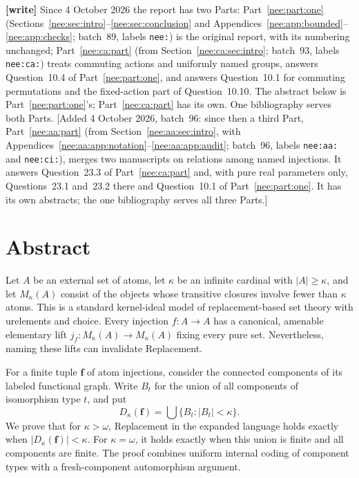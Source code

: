 \documentclass[11pt,letterpaper]{article}
\numberwithin{equation}{section}
\theoremstyle{plain}
\theoremstyle{definition}
\theoremstyle{remark}
\begin{document}
{\footnotesize\noindent\textbf{[write]} Since 4 October 2026 the report has two Parts: Part~\ref{nee:part:one} (Sections~\ref{nee:sec:intro}--\ref{nee:sec:conclusion} and Appendices~\ref{nee:app:bounded}--\ref{nee:app:checks}; batch~89, labels \texttt{nee:}) is the original report, with its numbering unchanged; Part~\ref{nee:ca:part} (from Section~\ref{nee:ca:sec:intro}; batch~93, labels \texttt{nee:ca:}) treats commuting actions and uniformly named groups, answers Question~10.4 of Part~\ref{nee:part:one}, and answers Question~10.1 for commuting permutations and the fixed-action part of Question~10.10. The abstract below is Part~\ref{nee:part:one}'s; Part~\ref{nee:ca:part} has its own. One bibliography serves both Parts. [Added 4 October 2026, batch~96: since then a third Part, Part~\ref{nee:aa:part} (from Section~\ref{nee:aa:sec:intro}, with Appendices~\ref{nee:aa:app:notation}--\ref{nee:aa:app:audit}; batch~96, labels \texttt{nee:aa:} and \texttt{nee:ci:}), merges two manuscripts on relations among named injections. It answers Question~23.3 of Part~\ref{nee:ca:part} and, with pure real parameters only, Questions~23.1 and~23.2 there and Question~10.1 of Part~\ref{nee:part:one}. It has its own abstracts; the one bibliography serves all three Parts.]\par}
\section*{Abstract}
Let $A$ be an external set of atoms, let $\kappa$ be an infinite cardinal with $|A|\geq\kappa$, and let $M_\kappa(A)$ consist of the objects whose transitive closures involve fewer than $\kappa$ atoms. This is a standard kernel-ideal model of replacement-based set theory with urelements and choice. Every injection $f:A\to A$ has a canonical, amenable elementary lift $j_f:M_\kappa(A)\to M_\kappa(A)$ fixing every pure set. Nevertheless, naming these lifts can invalidate Replacement.

For a finite tuple $\boldsymbol f$ of atom injections, consider the connected components of its labeled functional graph. Write $B_t$ for the union of all components of isomorphism type $t$, and put
\[
D_\kappa(\boldsymbol f)=\bigcup\{B_t:|B_t|<\kappa\}.
\]
We prove that for $\kappa>\omega$, Replacement in the expanded language holds exactly when $|D_\kappa(\boldsymbol f)|<\kappa$. For $\kappa=\omega$, it holds exactly when this union is finite and all components are finite. The proof combines uniform internal coding of component types with a fresh-component automorphism argument.
\end{document}
